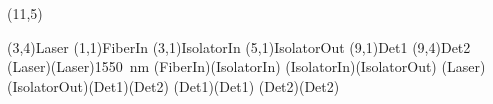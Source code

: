 \documentclass[pstricks]{standalone}
\begin{document}
	\begin{pspicture}[showgrid](11,5)
		\begin{optexp}
			\pnode(3,4){Laser}
		  	\pnode(1,1){FiberIn}
		  	\pnode(3,1){IsolatorIn}
		  	\pnode(5,1){IsolatorOut}
		  	\pnode(9,1){Det1}
		  	\pnode(9,4){Det2}
		  	\optbox[position=start, optboxsize=2 1, labeloffset=0](Laser)(Laser){\SI{1550}{\nano\meter}}
			\optfiber(FiberIn)(IsolatorIn)
			\optisolator(IsolatorIn)(IsolatorOut)
			\optcoupler(Laser)(IsolatorOut)(Det1)(Det2)
			\optdetector[dettype=diode](Det1)(Det1)
			\optdetector[dettype=diode](Det2)(Det2)
		\end{optexp}
	\end{pspicture}
\end{document}
